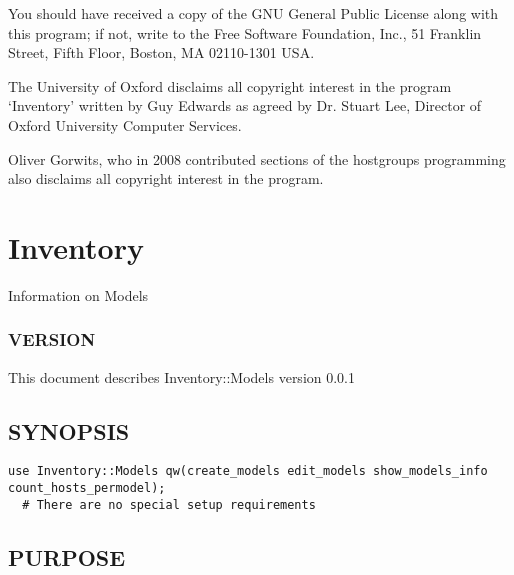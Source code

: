 \documentclass{book}
\begin{document}
You should have received a copy of the GNU General Public License along with this program; if not, write to the Free Software Foundation, Inc., 51 Franklin Street, Fifth Floor, Boston, MA 02110-1301 USA.



The University of Oxford disclaims all copyright interest in the program `Inventory' written by Guy Edwards as agreed by Dr. Stuart Lee, Director of Oxford University Computer Services.



Oliver Gorwits, who in 2008 contributed sections of the hostgroups programming also disclaims all copyright interest in the program.




\section{Inventory}
\label{_Inventory::Models}
\hypertarget{_Inventory::Models}{}



Information on Models


\subsubsection{VERSION}
\label{Inventory::Models_VERSION}
\hypertarget{Inventory::Models_VERSION}{}



This document describes Inventory::Models version 0.0.1


\subsection{SYNOPSIS}
\label{Inventory::Models_SYNOPSIS}
\hypertarget{Inventory::Models_SYNOPSIS}{}


\begin{Verbatim}[fontfamily=courier,gobble=1,frame=lines,fontsize=\scriptsize]
  use Inventory::Models qw(create_models edit_models show_models_info count_hosts_permodel);
  # There are no special setup requirements
\end{Verbatim}


\subsection{PURPOSE}
\label{Inventory::Models_PURPOSE}
\hypertarget{Inventory::Models_PURPOSE}{}
\end{document}
